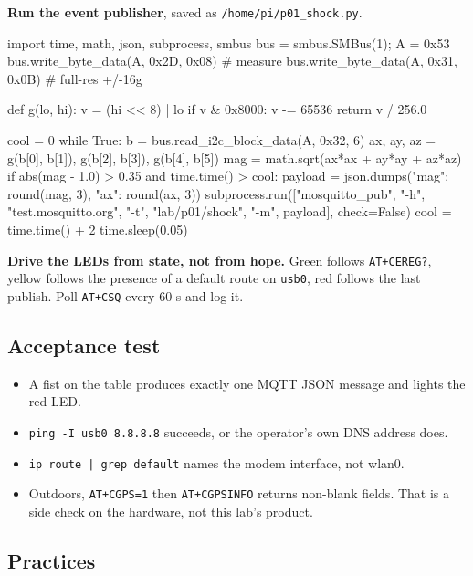 \begin{steps}
\item \textbf{Run the event publisher}, saved as \texttt{/home/pi/p01\_shock.py}.
\begin{pycode}
import time, math, json, subprocess, smbus
bus = smbus.SMBus(1); A = 0x53
bus.write_byte_data(A, 0x2D, 0x08)   # measure
bus.write_byte_data(A, 0x31, 0x0B)   # full-res +/-16g

def g(lo, hi):
    v = (hi << 8) | lo
    if v & 0x8000:
        v -= 65536
    return v / 256.0

cool = 0
while True:
    b = bus.read_i2c_block_data(A, 0x32, 6)
    ax, ay, az = g(b[0], b[1]), g(b[2], b[3]), g(b[4], b[5])
    mag = math.sqrt(ax*ax + ay*ay + az*az)
    if abs(mag - 1.0) > 0.35 and time.time() > cool:
        payload = json.dumps({"mag": round(mag, 3), "ax": round(ax, 3)})
        subprocess.run(["mosquitto_pub", "-h", "test.mosquitto.org",
                        "-t", "lab/p01/shock", "-m", payload], check=False)
        cool = time.time() + 2
    time.sleep(0.05)
\end{pycode}

\item \textbf{Drive the LEDs from state, not from hope.} Green follows \texttt{AT+CEREG?}, yellow follows the presence of a default route on \texttt{usb0}, red follows the last publish. Poll \texttt{AT+CSQ} every 60 s and log it.
\end{steps}

\subsection*{Acceptance test}

\begin{itemize}
\item A fist on the table produces exactly one MQTT JSON message and lights the red LED.
\item \texttt{ping -I usb0 8.8.8.8} succeeds, or the operator's own DNS address does.
\item \texttt{ip route | grep default} names the modem interface, not wlan0.
\item Outdoors, \texttt{AT+CGPS=1} then \texttt{AT+CGPSINFO} returns non-blank fields. That is a side check on the hardware, not this lab's product.
\end{itemize}

\subsection*{Practices}

